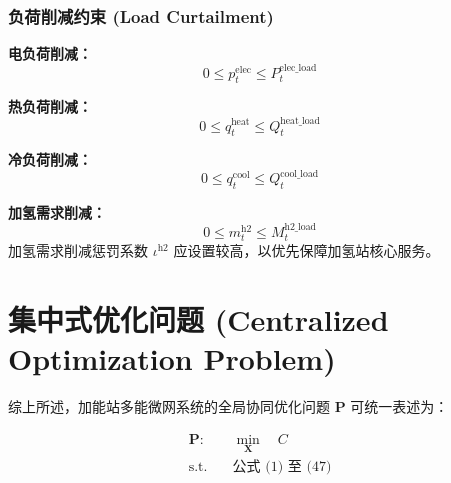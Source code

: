 \documentclass[11pt]{ctexart}
\begin{document}
\subsubsection{负荷削减约束 (Load Curtailment)}

\textbf{电负荷削减：}
\begin{equation}
0 \le p_{t}^{\text{elec}} \le P_{t}^{\text{elec\_load}}
\end{equation}

\textbf{热负荷削减：}
\begin{equation}
0 \le q_{t}^{\text{heat}} \le Q_{t}^{\text{heat\_load}}
\end{equation}

\textbf{冷负荷削减：}
\begin{equation}
0 \le q_{t}^{\text{cool}} \le Q_{t}^{\text{cool\_load}}
\end{equation}

\textbf{加氢需求削减：}
\begin{equation}
0 \le m_{t}^{\text{h2}} \le M_{t}^{\text{h2\_load}}
\end{equation}
加氢需求削减惩罚系数 $\iota^{\text{h2}}$ 应设置较高，以优先保障加氢站核心服务。

\section{集中式优化问题 (Centralized Optimization Problem)}

综上所述，加能站多能微网系统的全局协同优化问题 $\mathbf{P}$ 可统一表述为：

\begin{align*}
\mathbf{P}: \quad &\min_{\mathbf{X}} \quad C \\
\text{s.t.} \quad &\text{公式 (1) 至 (47)}
\end{align*}
\end{document}
